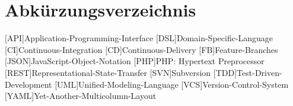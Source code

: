 \chapter{Abkürzungsverzeichnis}

\begin{acronym}
[API]{Application-Programming-Interface}
[DSL]{Domain-Specific-Language}
[CI]{Continuous-Integration}
[CD]{Continuous-Delivery}
[FB]{Feature-Branches}
[JSON]{JavaScript-Object-Notation}
[PHP]{PHP: Hypertext Preprocessor}
[REST]{Representational-State-Transfer}
[SVN]{Subversion}
[TDD]{Test-Driven-Development}
[UML]{Unified-Modeling-Language}
[VCS]{Version-Control-System}
[YAML]{Yet-Another-Multicolumn-Layout}
\end{acronym}

